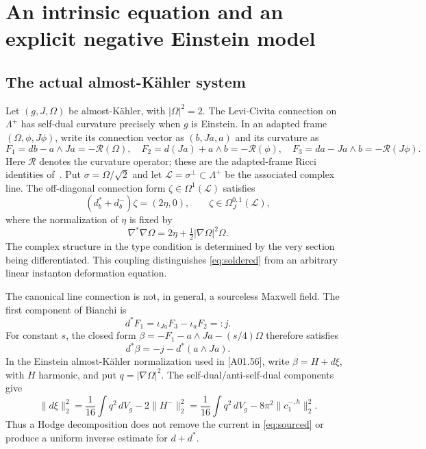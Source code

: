 \documentclass[11pt]{article}
\newcommand{\dd}{\,dV_g}
\newcommand{\src}[1]{\textsf{[#1]}}
\theoremstyle{definition}
\theoremstyle{remark}
\begin{document}
\section{An intrinsic equation and an explicit negative Einstein model}
\label{sec:ake}

\subsection{The actual almost-K\"ahler system}

Let $(g,J,\Omega)$ be almost-K\"ahler, with $|\Omega|^2=2$.
The Levi-Civita connection on $\Lambda^+$ has self-dual curvature precisely
when $g$ is Einstein. In an adapted frame $(\Omega,\phi,J\phi)$,
write its connection vector as $(b,Ja,a)$ and its curvature as
\begin{equation}
 F_1=db-a\wedge Ja=-\mathcal R(\Omega),\quad
 F_2=d(Ja)+a\wedge b=-\mathcal R(\phi),\quad
 F_3=da-Ja\wedge b=-\mathcal R(J\phi).
 \label{eq:frame-curvature}
\end{equation}
Here $\mathcal R$ denotes the curvature operator; these are the adapted-frame
Ricci identities of~\cite{AAD}. Put $\sigma=\Omega/\sqrt2$ and let
$\mathscr L=\sigma^\perp\subset\Lambda^+$ be the associated complex line.
The off-diagonal connection form $\zeta\in\Omega^1(\mathscr L)$ satisfies
\begin{equation}
 (d_b^*+d_b^-)\zeta=(2\eta,0),\qquad
 \zeta\in\Omega_J^{0,1}(\mathscr L),
 \label{eq:soldered}
\end{equation}
where the normalization of $\eta$ is fixed by
\[
 \nabla^*\nabla\Omega=2\eta+\tfrac12|\nabla\Omega|^2\Omega.
\]
The complex structure in the type condition is determined by the very
section being differentiated. This coupling distinguishes
\eqref{eq:soldered} from an arbitrary linear instanton deformation equation.

The canonical line connection is not, in general, a sourceless Maxwell
field. The first component of Bianchi is
\begin{equation}
 d^*F_1=\iota_{Ja}F_3-\iota_aF_2=:j.
 \label{eq:sourced}
\end{equation}
For constant $s$, the closed form
$\beta=-F_1-a\wedge Ja-(s/4)\Omega$ therefore satisfies
\[
 d^*\beta=-j-d^*(a\wedge Ja).
\]
In the Einstein almost-K\"ahler normalization used in \src{A01.56},
write $\beta=H+d\xi$, with $H$ harmonic, and put $q=|\nabla\Omega|^2$.
The self-dual/anti-self-dual components give
\begin{equation}
 \|d\xi\|_2^2=\frac1{16}\int q^2\dd-2\|H^-\|_2^2
 =\frac1{16}\int q^2\dd-8\pi^2\|c_1^{-,h}\|_2^2.
 \label{eq:hodge-remainder}
\end{equation}
Thus a Hodge decomposition does not remove the current in
\eqref{eq:sourced} or produce a uniform inverse estimate for $d+d^*$.
\end{document}
